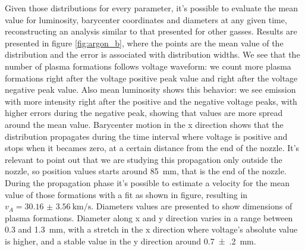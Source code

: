 Given those distributions for every parameter, it's possible to evaluate the mean value for luminosity, barycenter coordinates and diameters at any given time, reconstructing an analysis similar to that presented for other gasses. Results are presented in figure \ref{fig:argon_b}, where the points are the mean value of the distribution and the error is associated with distribution widths.
We see that the number of plasma formations follows voltage waveform: we count more plasma formations right after the voltage positive peak value and right after the voltage negative peak value. Also mean luminosity shows this behavior: we see emission with more intensity right after the positive and the negative voltage peaks, with higher errors during the negative peak, showing that values are more spread around the mean value.
Barycenter motion in the x direction shows that the distribution propagates during the time interval where voltage is positive and stops when it becames zero, at a certain distance from the end of the nozzle. It's relevant to point out that we are studying this propagation only outside the nozzle, so position values starts around \SI{85}{\milli\meter}, that is the end of the nozzle. During the propagation phase it's possible to estimate a velocity for the mean value of those formations with a fit as shown in figure, resulting in $v_A = \SI{30.16(356)}{\kilo\meter/\second}$.
Diameters values are presented to show dimensions of plasma formations. Diameter along x and y direction varies in a range between \num{0.3} and \SI{1.3}{\milli\meter}, with a stretch in the x direction where voltage's absolute value is higher, and a stable value in the y direction around \SI{0.7(2)}{\milli\meter}. 

